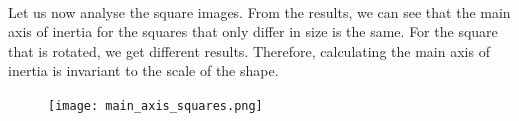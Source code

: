 \paragraph{}
Let us now analyse the square images. From the results, we can see that the main axis of inertia for the squares that only differ in size is the same.
For the square that is rotated, we get different results. Therefore, calculating the main axis of inertia is invariant to the scale of the shape.
\begin{figure}[H]
    \centering
    \texttt{[image: main\_axis\_squares.png]}
    \label{fig:main-axis-squares}
\end{figure}


